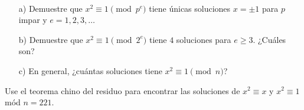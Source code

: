 \documentclass{article}
\begin{document}
\begin{problema}
  ~

  \begin{enumerate}
  \item[a)] Demuestre que $x^2 \equiv 1 \pmod{p^e}$ tiene únicas soluciones
    $x = \pm 1$ para $p$ impar y $e = 1,2,3,\ldots$

  \item[b)] Demuestre que $x^2 \equiv 1 \pmod{2^e}$ tiene $4$ soluciones para
    $e \ge 3$. ¿Cuáles son?

  \item[c)] En general, ¿cuántas soluciones tiene $x^2 \equiv 1 \pmod{n}$?
  \end{enumerate}
\end{problema}

\begin{problema}
  Use el teorema chino del residuo para encontrar las soluciones de
  $x^2 \equiv x$ y $x^2 \equiv 1$ mód $n = 221$.
\end{problema}
\end{document}
